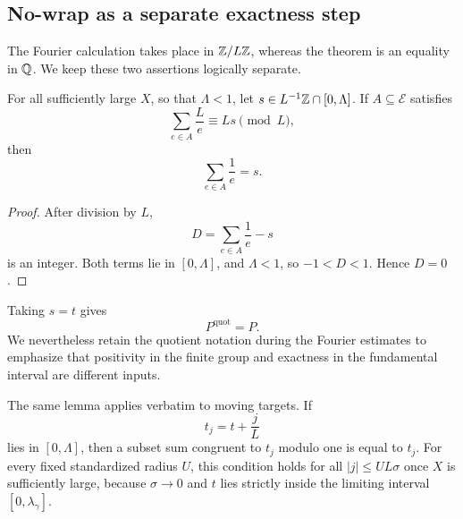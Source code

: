 \subsection{No-wrap as a separate exactness step}

The Fourier calculation takes place in $\mathbb Z/L\mathbb Z$, whereas the theorem is an equality in $\mathbb Q$. We keep these two assertions logically separate.

\begin{lemma}[No-wrap]\label{lem:no-wrap}
For all sufficiently large $X$, so that $\Lambda<1$, let $s\in L^{-1}\mathbb Z\cap[0,\Lambda]$. If $A\subseteq\mathcal E$ satisfies
\[
\sum_{e\in A}\frac{L}{e}
\equiv Ls\pmod L,
\tag{3.9}\label{eq:3.9}
\]
then
\[
\sum_{e\in A}\frac1e=s.
\tag{3.10}\label{eq:3.10}
\]
\end{lemma}

\begin{proof}
After division by $L$,
\[
D=
\sum_{e\in A}\frac1e-s
\]
is an integer. Both terms lie in $[0,\Lambda]$, and $\Lambda<1$, so $-1<D<1$. Hence $D=0$.
\end{proof}

Taking $s=t$ gives
\[
P^{\mathrm{quot}}=P.
\tag{3.11}\label{eq:3.11}
\]
We nevertheless retain the quotient notation during the Fourier estimates to emphasize that positivity in the finite group and exactness in the fundamental interval are different inputs.

The same lemma applies verbatim to moving targets. If
\[
t_j=t+\frac{j}{L}
\]
lies in $[0,\Lambda]$, then a subset sum congruent to $t_j$ modulo one is equal to $t_j$. For every fixed standardized radius $U$, this condition holds for all $|j|\le UL\sigma$ once $X$ is sufficiently large, because $\sigma\to0$ and $t$ lies strictly inside the limiting interval $[0,\lambda_\gamma]$.